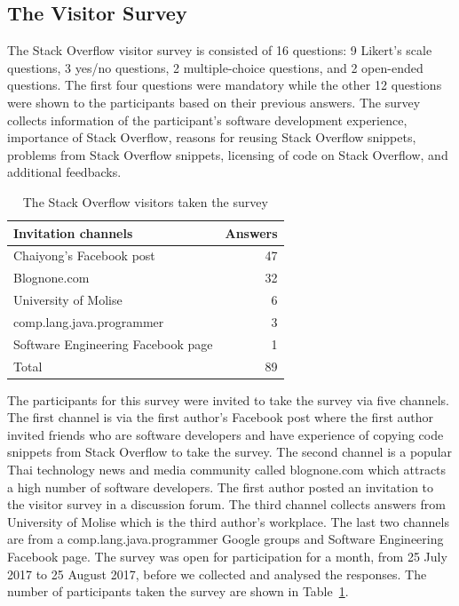 \documentclass{svjour3}                     %
\begin{document}
\subsection{The Visitor Survey}

The Stack Overflow visitor survey is consisted of 16 questions: 9 Likert's scale
questions, 3 yes/no questions, 2 multiple-choice questions, and 2 open-ended
questions. The first four questions were mandatory while the other 12 questions
were shown to the participants based on their previous answers. The survey collects
information of the participant's software development experience, importance of
Stack Overflow, reasons for reusing Stack Overflow snippets, problems from
Stack Overflow snippets, licensing of code on Stack Overflow, and additional
feedbacks.

\begin{table}
	\centering
	\caption{The Stack Overflow visitors taken the survey}
	\label{tab:visitors}
	\begin{tabular}{lr}
		\toprule
		Invitation channels & Answers \\
		\midrule
		Chaiyong's Facebook post & 47 \\
		Blognone.com & 32 \\
		University of Molise & 6 \\
		comp.lang.java.programmer & 3 \\
		Software Engineering Facebook page & 1 \\
		\midrule
		Total & 89 \\
		\bottomrule
	\end{tabular}
\end{table}

The participants for this survey were invited to take the survey via five
channels. The first channel is via the first author's Facebook post where the
first author invited friends who are software developers and have experience of
copying code snippets from Stack Overflow to take the survey. The second channel
is a popular Thai technology news and media community called blognone.com which
attracts a high number of software developers. The first author posted an
invitation to the visitor survey in a discussion forum. The third channel
collects answers from University of Molise which is the third author's
workplace. The last two channels are from a comp.lang.java.programmer Google
groups and Software Engineering Facebook page. The survey was open for
participation for a month, from 25 July 2017 to 25 August 2017, before we
collected and analysed the responses. The number of participants taken the
survey are shown in Table~\ref{tab:visitors}.
\end{document}
